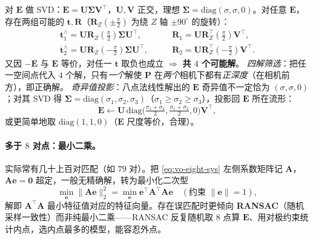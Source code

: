 \begin{derivation}
\label{thm:vo-recover-Rt}
对 $\mathbf{E}$ 做 SVD\cite{gaoxiang2019slam14}：$\mathbf{E}=\mathbf{U}\boldsymbol{\Sigma}\mathbf{V}^\top$，$\mathbf{U},\mathbf{V}$ 正交，理想 $\boldsymbol{\Sigma}=\mathrm{diag}(\sigma,\sigma,0)$。对任意 $\mathbf{E}$，存在两组可能的 $\mathbf{t},\mathbf{R}$（$\mathbf{R}_Z(\pm\tfrac{\pi}{2})$ 为绕 $Z$ 轴 $\pm90^\circ$ 的旋转）：
\begin{align}
  \mathbf{t}_1^\wedge=\mathbf{U}\mathbf{R}_Z(\tfrac{\pi}{2})\boldsymbol{\Sigma}\mathbf{U}^\top,&\qquad
  \mathbf{R}_1=\mathbf{U}\mathbf{R}_Z^\top(\tfrac{\pi}{2})\mathbf{V}^\top,\label{eq:vo-Rt1}\\
  \mathbf{t}_2^\wedge=\mathbf{U}\mathbf{R}_Z(-\tfrac{\pi}{2})\boldsymbol{\Sigma}\mathbf{U}^\top,&\qquad
  \mathbf{R}_2=\mathbf{U}\mathbf{R}_Z^\top(-\tfrac{\pi}{2})\mathbf{V}^\top.\label{eq:vo-Rt2}
\end{align}
又因 $-\mathbf{E}$ 与 $\mathbf{E}$ 等价，对任一 $\mathbf{t}$ 取负也成立 $\Rightarrow$ \textbf{共 $4$ 个可能解}。
\emph{四解筛选}：把任一空间点代入 $4$ 个解，只有\emph{一个}解使 $\mathbf{P}$ 在\emph{两个}相机下都有\emph{正深度}（在相机前方），即正确解。
\emph{奇异值投影}：八点法线性解出的 $\mathbf{E}$ 奇异值不一定恰为 $(\sigma,\sigma,0)$；对其 SVD 得 $\boldsymbol{\Sigma}=\mathrm{diag}(\sigma_1,\sigma_2,\sigma_3)$（$\sigma_1\ge\sigma_2\ge\sigma_3$），投影回 $\mathbf{E}$ 所在流形：
\begin{equation}
  \mathbf{E}\leftarrow\mathbf{U}\,\mathrm{diag}\!\Big(\tfrac{\sigma_1+\sigma_2}{2},\tfrac{\sigma_1+\sigma_2}{2},0\Big)\mathbf{V}^\top,
  \label{eq:vo-E-project}
\end{equation}
或更简单地取 $\mathrm{diag}(1,1,0)$（$\mathbf{E}$ 尺度等价，合理）。
\end{derivation}

\paragraph{多于 $8$ 对点：最小二乘\cite{gaoxiang2019slam14}。}实际常有几十上百对匹配（如 $79$ 对）。把 \cref{eq:vo-eight-sys} 左侧系数矩阵记 $\mathbf{A}$，$\mathbf{A}\mathbf{e}=\mathbf{0}$ 超定，一般无精确解，转为最小化二次型
\begin{equation}
  \min_{\mathbf{e}}\|\mathbf{A}\mathbf{e}\|_2^2=\min_{\mathbf{e}}\mathbf{e}^\top\mathbf{A}^\top\mathbf{A}\mathbf{e}\quad(\text{约束 }\|\mathbf{e}\|=1),
  \label{eq:vo-eight-ls}
\end{equation}
解即 $\mathbf{A}^\top\mathbf{A}$ 最小特征值对应的特征向量。存在误匹配时更倾向 \textbf{RANSAC}（随机采样一致性）而非纯最小二乘——RANSAC 反复随机取 $8$ 点算 $\mathbf{E}$、用对极约束统计内点，选内点最多的模型，能容忍外点。

